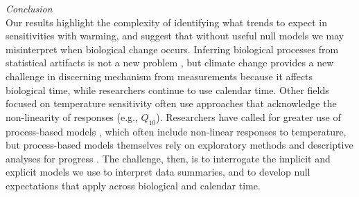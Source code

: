 \documentclass[11pt,letter]{article}
\begin{document}

\emph{Conclusion}\\
Our results highlight the complexity of identifying what trends to expect in sensitivities with warming, and suggest that without useful null models we may misinterpret when biological change occurs. Inferring biological processes from statistical artifacts is not a new problem \citep[e.g.,][]{nee2005}, but climate change provides a new challenge in discerning mechanism from measurements because it affects biological time, while researchers continue to use calendar time. Other fields focused on temperature sensitivity often use approaches that acknowledge the non-linearity of responses (e.g., $Q_{10}$). Researchers have called for greater use of process-based models \citep{keenan2019}, which often include non-linear responses to temperature, but process-based models themselves rely on exploratory methods and descriptive analyses for progress \citep{chuine2016}. The challenge, then, is to interrogate the implicit and explicit models we use to interpret data summaries, and to develop null expectations that apply across biological and calendar time. \\



\vspace{5ex}
\end{document}
